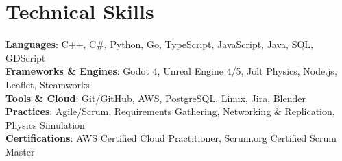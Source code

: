 \documentclass[letterpaper,11pt]{article}
\begin{document}
\section{Technical Skills}
 \begin{itemize}[leftmargin=0.15in, label={}]
    \small{\item{
     \textbf{Languages}{: C++, C\#, Python, Go, TypeScript, JavaScript, Java, SQL, GDScript} \\
     \textbf{Frameworks \& Engines}{: Godot 4, Unreal Engine 4/5, Jolt Physics, Node.js, Leaflet, Steamworks} \\
     \textbf{Tools \& Cloud}{: Git/GitHub, AWS, PostgreSQL, Linux, Jira, Blender} \\
     \textbf{Practices}{: Agile/Scrum, Requirements Gathering, Networking \& Replication, Physics Simulation} \\
     \textbf{Certifications}{: AWS Certified Cloud Practitioner, Scrum.org Certified Scrum Master}
    }}
 \end{itemize}
\end{document}
